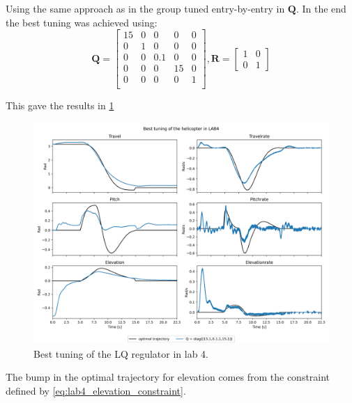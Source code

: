 \documentclass[../main.tex]{subfiles}
\begin{document}
Using the same approach as in the group tuned entry-by-entry in $ \bm Q $. In the end the best tuning was achieved using: 
\begin{equation}\label{key}
	\bm Q = \begin{bmatrix}
		15 & 0 & 0 & 0 & 0 \\
		0 & 1 & 0 & 0 & 0 \\
		0 & 0 & 0.1 & 0 & 0 \\
		0 & 0 & 0 & 15 & 0 \\
		0 & 0 & 0 & 0 & 1 \\
	\end{bmatrix}, 
	\bm R = \begin{bmatrix}
		1 & 0 \\ 
		0 & 1
	\end{bmatrix}
\end{equation}

This gave the results in \cref{fig:LAB4_best_tuning}
\begin{figure}[h]
	\centering
	\includegraphics[width=\linewidth]{figures/LAB4_best_tunings.png}
	\caption{Best tuning of the LQ regulator in lab 4.}
	\label{fig:LAB4_best_tuning}
\end{figure}
The bump in the optimal trajectory for elevation comes from the constraint defined by \cref{eq:lab4_elevation_constraint}.
\end{document}

